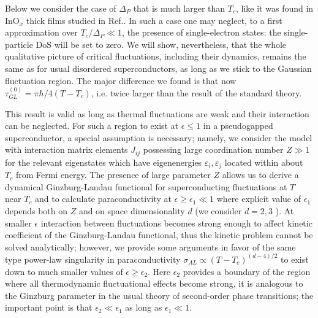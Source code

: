 \documentclass[twocolumn,english,prb]{revtex4-1}
\begin{document}
Below we consider the case of $\Delta_P$ that is much larger than $T_c$, like it was found
in InO$_x$ thick films studied in Ref.. In such a case one may neglect, to a first approximation over 
$T_c/\Delta_P \ll 1$, the presence of single-electron states:  the single-particle DoS will be set to zero.
We will show, nevertheless, that the whole qualitative picture of critical fluctuations, including their
dynamics, remains the same as for usual disordered superconductors, as long as we stick to the Gaussian fluctuation
region.  The major difference we found is that now $\tau_{GL}^{(0)} = \pi \hbar/4(T-T_c)$, i.e. twice larger
 than the result of the standard theory.   

This result is valid as long as thermal fluctuations are weak
and their interaction can be neglected.  For such a region to exist at $\epsilon \leq 1$ in a pseudogapped 
superconductor, a special  assumption is necessary; namely, we consider the model with interaction matrix
elements $J_{ij}$ possessing  large coordination number $Z \gg 1$ for the relevant eigenstates 
which  have eigenenergies $\varepsilon_i ,\varepsilon_j$ located within about $T_c$ from Fermi energy.
The presence of large parameter $Z$ allows us to derive a dynamical Ginzburg-Landau functional for superconducting
fluctuations at $T$ near $T_c$ and to calculate paraconductivity at $\epsilon \geq \epsilon_1 \ll 1$ where explicit value of
$\epsilon_1$ depends both on $Z$ and on space dimensionality $d$ (we consider $d=2,3$ ).
At smaller $\epsilon$ interaction between fluctuations becomes strong enough to  affect kinetic coefficient of the
Ginzburg-Landau functional, thus the kinetic problem cannot be solved
analytically; however,  we provide some arguments in favor of the same type power-law singularity
in paraconductivity  $\sigma_{AL} \propto (T-T_c)^{(d-4)/2}$
to exist down to much smaller values of  $\epsilon \geq \epsilon_2$.
Here  $\epsilon_2$ provides a boundary of the region where all thermodynamic fluctuational effects become strong,
it is analogous to the Ginzburg parameter in the usual theory of second-order phase transitions; the important point
is that  $\epsilon_2 \ll \epsilon_1$ as long as $\epsilon_1 \ll 1$.
\end{document}
